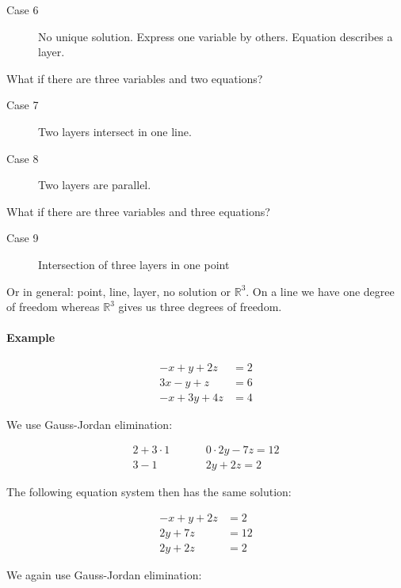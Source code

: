 \documentclass[a4paper,landscape,twocolumn]{article}
\begin{document}
\begin{description}
  \item[Case 6]
    No unique solution. Express one variable by others.
    Equation describes a layer.
\end{description}

What if there are three variables and two equations?

\begin{description}
  \item[Case 7] Two layers intersect in one line.
  \item[Case 8] Two layers are parallel.
\end{description}

What if there are three variables and three equations?

\begin{description}
  \item[Case 9] Intersection of three layers in one point
\end{description}

Or in general: point, line, layer, no solution or $\mathbb{R}^3$.
On a line we have one degree of freedom whereas $\mathbb{R}^3$ gives us three degrees of freedom.

\paragraph{Example}
\begin{align*}
  -x  +y +2z &= 2 \\
  3x  -y  +z  &=6 \\
  -x +3y +4z &= 4
\end{align*}

We use Gauss-Jordan elimination:

\[
  \begin{array}{ccc}
    2 + 3\cdot 1 & \hspace{20pt} & 0\cdot 2y - 7z = 12 \\
    3 - 1        & \hspace{20pt} & 2y + 2z = 2
  \end{array}
\]

The following equation system then has the same solution:

\begin{align*}
  -x + y + 2z &= 2 \\
  2y + 7z &= 12 \\
  2y + 2z &= 2
\end{align*}

We again use Gauss-Jordan elimination:
\end{document}
